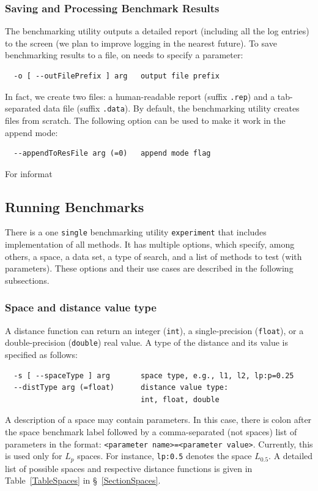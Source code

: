 \documentclass[runningheads,a4paper]{llncs}
\newcommand{\ttt}[1]{\texttt{#1}}
\begin{document}
{\subsubsection{Saving and Processing Benchmark Results}
The benchmarking utility outputs a detailed report (including all the log entries) to the screen
(we plan to improve logging in the nearest future).
To save benchmarking results to a file, on needs to specify a parameter:
\begin{verbatim}
  -o [ --outFilePrefix ] arg   output file prefix
\end{verbatim}
In fact, we create two files: a human-readable report (suffix \ttt{.rep}) and 
a tab-separated data file (suffix \ttt{.data}).
By default, the benchmarking utility creates files from scratch. The
following option can be used to make it work in the append mode:
\begin{verbatim}
  --appendToResFile arg (=0)   append mode flag
\end{verbatim}
For informat

\subsection{Running Benchmarks}\label{SectionRunBenchmark}
There is a one \ttt{single} benchmarking utility 
\ttt{experiment} that includes implementation of all methods.
It has multiple options, which specify, among others, 
a space, a data set, a type of search, and a list of methods to test (with parameters).
These options and their use cases are described in the following subsections.

\subsubsection{Space and distance value type}

A distance function can return an integer (\ttt{int}), a single-precision (\ttt{float}),
or a double-precision (\ttt{double}) real value.
A type of the distance and its value is specified as follows:

\begin{verbatim}
  -s [ --spaceType ] arg       space type, e.g., l1, l2, lp:p=0.25
  --distType arg (=float)      distance value type: 
                               int, float, double
\end{verbatim}

A description of a space may contain parameters.
In this case, there is colon after the space benchmark label followed by a
comma-separated (not spaces) list of parameters in the format:
\ttt{<parameter name>=<parameter value>}.
Currently, this is used only for $L_p$ spaces. For instance,
 \ttt{lp:0.5} denotes the space $L_{0.5}$.
A detailed list of possible spaces and respective
distance functions is given in Table~\ref{TableSpaces} in \S~\ref{SectionSpaces}.

}
\end{document}
